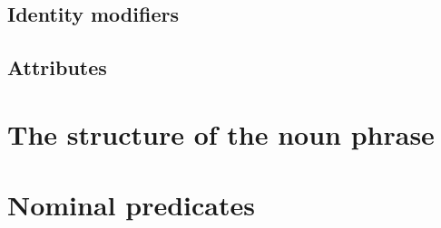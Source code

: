 \subsection{Identity modifiers} \label{sec:identity.modifier}


\subsection{Attributes}

\section{The structure of the noun phrase}

\section{Nominal predicates}
